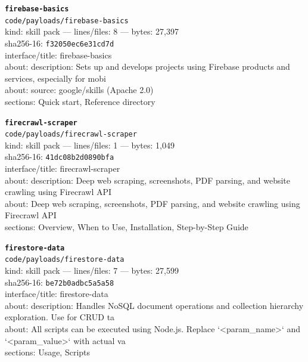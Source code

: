 \noindent\textbf{\texttt{firebase-basics}}\\
\texttt{code/payloads/firebase-basics}\\
kind: skill pack --- lines/files: 8 --- bytes: 27,397\\
sha256-16: \texttt{f32050ec6e31cd7d}\\
interface/title: firebase-basics\\
about: description: Sets up and develops projects using Firebase products and services, especially for mobi\\
about: source: google/skills (Apache 2.0)\\
sections: Quick start, Reference directory\\
\vspace*{6.0pt}

\noindent\textbf{\texttt{firecrawl-scraper}}\\
\texttt{code/payloads/firecrawl-scraper}\\
kind: skill pack --- lines/files: 1 --- bytes: 1,049\\
sha256-16: \texttt{41dc08b2d0890bfa}\\
interface/title: firecrawl-scraper\\
about: description: Deep web scraping, screenshots, PDF parsing, and website crawling using Firecrawl API\\
about: Deep web scraping, screenshots, PDF parsing, and website crawling using Firecrawl API\\
sections: Overview, When to Use, Installation, Step-by-Step Guide\\
\vspace*{6.0pt}
\newpage

\noindent\textbf{\texttt{firestore-data}}\\
\texttt{code/payloads/firestore-data}\\
kind: skill pack --- lines/files: 7 --- bytes: 27,599\\
sha256-16: \texttt{be72b0adbc5a5a58}\\
interface/title: firestore-data\\
about: description: Handles NoSQL document operations and collection hierarchy exploration. Use for CRUD ta\\
about: All scripts can be executed using Node.js. Replace `<param\_name>` and `<param\_value>` with actual va\\
sections: Usage, Scripts\\
\vspace*{6.0pt}

